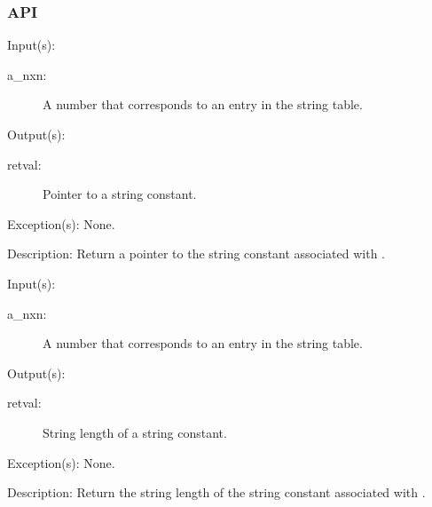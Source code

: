 \subsubsection{API}
\begin{capi}
\label{nxn_str}
	\begin{capilist}
	\item[Input(s): ]
		\begin{description}\item[]
		\item[a\_nxn: ]
			A number that corresponds to an entry in the string
			table.
		\end{description}
	\item[Output(s): ]
		\begin{description}\item[]
		\item[retval: ]
			Pointer to a string constant.
		\end{description}
	\item[Exception(s): ] None.
	\item[Description: ]
		Return a pointer to the string constant associated with
		.
	\end{capilist}
\label{nxn_len}
	\begin{capilist}
	\item[Input(s): ]
		\begin{description}\item[]
		\item[a\_nxn: ]
			A number that corresponds to an entry in the string
			table.
		\end{description}
	\item[Output(s): ]
		\begin{description}\item[]
		\item[retval: ]
			String length of a string constant.
		\end{description}
	\item[Exception(s): ] None.
	\item[Description: ]
		Return the string length of the string constant associated with
		\cvar{a\_nxn}.
	\end{capilist}
\end{capi}
